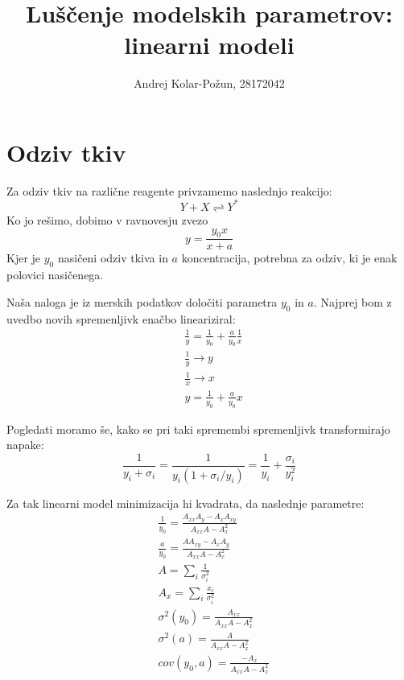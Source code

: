 \documentclass{article}
\title{Luščenje modelskih parametrov: linearni modeli}
\author{Andrej Kolar-Požun, 28172042}
\begin{document}
\maketitle
\newpage
{}
\section{Odziv tkiv}

Za odziv tkiv na različne reagente privzamemo naslednjo reakcijo:
\begin{equation*}
Y + X \rightleftharpoons Y^* 
\end{equation*}
Ko jo rešimo, dobimo v ravnovesju zvezo
\begin{equation*}
y = \frac{y_0 x}{x+a}
\end{equation*}
Kjer je $y_0$ nasičeni odziv tkiva in $a$ koncentracija, potrebna za odziv, ki je enak polovici nasičenega.

Naša naloga je iz merskih podatkov določiti parametra $y_0$ in $a$. Najprej bom z uvedbo novih spremenljivk enačbo lineariziral:
\begin{align*}
&\frac{1}{y} = \frac{1}{y_0} + \frac{a}{y_0}\frac{1}{x} \\
&\frac{1}{y} \rightarrow y \\
&\frac{1}{x} \rightarrow x \\
&y = \frac{1}{y_0} + \frac{a}{y_0} x
\end{align*}

Pogledati moramo še, kako se pri taki spremembi spremenljivk transformirajo napake:
\begin{equation*}
\frac{1}{y_i + \sigma_i} = \frac{1}{y_i(1+\sigma_i/y_i)} = \frac{1}{y_i} + \frac{\sigma_i}{y_i^2}
\end{equation*}

Za tak linearni model minimizacija hi kvadrata, da naslednje parametre:
\begin{align*}
&\frac{1}{y_0} = \frac{A_{xx}A_y - A_xA_{xy}}{A_{xx}A - A_x^2}\\
&\frac{a}{y_0} = \frac{AA_{xy} - A_x A_y}{A_{xx}A - A_x^2} \\
&A = \sum_i \frac{1}{\sigma_i^2} \\
&A_x = \sum_i \frac{x_i}{\sigma_i^2} \\
&\sigma^2(y_0) = \frac{A_{xx}}{A_{xx}A - A_x^2} \\
&\sigma^2(a) = \frac{A}{A_{xx}A - A_x^2} \\
&cov(y_0,a) = \frac{-A_x}{A_{xx}A - A_x^2} \\
\end{align*}
\end{document}
